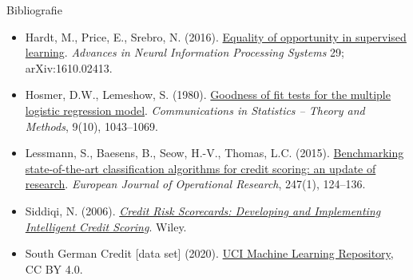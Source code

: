 \begin{frame}{Bibliografie}
\begin{itemize}
    \item Hardt, M., Price, E., Srebro, N. (2016). \href{https://arxiv.org/abs/1610.02413}{Equality of opportunity in supervised learning}. \textit{Advances in Neural Information Processing Systems} 29; arXiv:1610.02413.
    \item Hosmer, D.W., Lemeshow, S. (1980). \href{https://doi.org/10.1080/03610928008827941}{Goodness of fit tests for the multiple logistic regression model}. \textit{Communications in Statistics -- Theory and Methods}, 9(10), 1043--1069.
    \item Lessmann, S., Baesens, B., Seow, H.-V., Thomas, L.C. (2015). \href{https://doi.org/10.1016/j.ejor.2015.05.030}{Benchmarking state-of-the-art classification algorithms for credit scoring: an update of research}. \textit{European Journal of Operational Research}, 247(1), 124--136.
    \item Siddiqi, N. (2006). \href{https://doi.org/10.1002/9781119201731}{\textit{Credit Risk Scorecards: Developing and Implementing Intelligent Credit Scoring}}. Wiley.
    \item South German Credit [data set] (2020). \href{https://doi.org/10.24432/C5QG88}{UCI Machine Learning Repository}, CC BY 4.0.
\end{itemize}
\end{frame}


